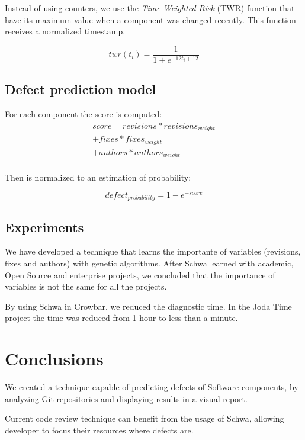 \documentclass[9pt,a4paper]{extarticle}
\begin{document}
\begin{multicols}{2}
Instead of using counters, we use the \emph{Time-Weighted-Risk} (TWR) function that
have its maximum value when a component was changed recently. This function
receives a normalized timestamp\cite{Chris2013}.

\begin{equation}
twr(t_i) = \frac{1}{1 + e^{-12t_i + 12 }}
\end{equation}

\subsection{Defect prediction model}
For each component the score is computed:
\begin{equation}
\begin{multlined}score = revisions * revisions_{weight} \\
+ fixes * fixes_{weight} \\
+ authors * authors_{weight} \\
\end{multlined}
\end{equation}

Then is normalized to an estimation of probability:

\begin{equation}
defect_{probability} = 1 - e^{-score}
\end{equation}

\subsection{Experiments}
We have developed a technique that learns the importante of variables (revisions,
fixes and authors) with genetic algorithms. After Schwa learned with academic,
Open Source and enterprise projects, we concluded that the importance of variables
is not the same for all the projects.

By using Schwa in Crowbar, we reduced the diagnostic time. In the Joda Time project
the time was reduced from 1 hour to less than a minute.

\section{Conclusions}\label{sec:conclui}
We created a technique capable of predicting defects of Software components, by
analyzing Git repositories and displaying results in a visual report.

Current code review technique can benefit from the usage of Schwa, allowing
developer to focus their resources where defects are.



\end{multicols}
\end{document}
